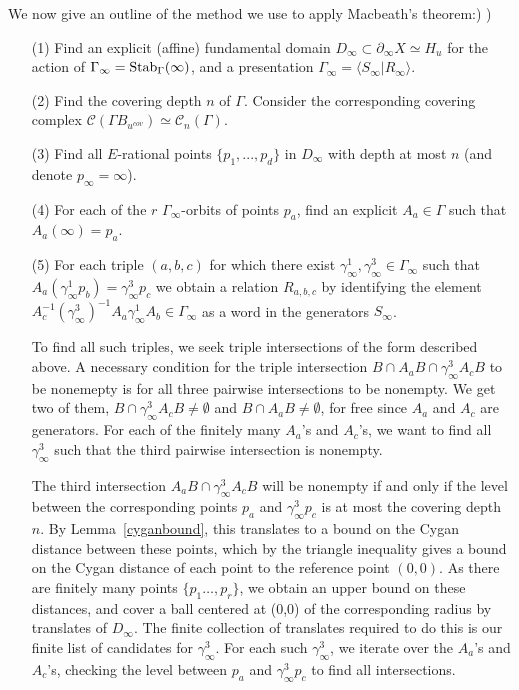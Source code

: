 \documentclass{article}[12pt]
\begin{document}
We now give an outline of the method we use to apply Macbeath's theorem:)
)
\begin{itemize}
\item[(1)] Find an explicit (affine) fundamental domain $D_\infty \subset \partial_\infty X \simeq H_u$ for the action of $\Gamma_\infty={\rm Stab}_\Gamma(\infty)$, and a presentation $\Gamma_\infty= \langle S_\infty \vert R_\infty \rangle$.
\item[(2)] Find the covering depth $n$ of $\Gamma$. 
  Consider the corresponding covering complex $\mathcal{C}(\Gamma B_{u^{cov}}) \simeq \mathcal{C}_n(\Gamma)$.
\item[(3)] Find all $E$-rational points $\{p_1,...,p_d\}$ in $D_\infty$ with depth at most $n$ (and denote $p_\infty=\infty$).
\item[(4)] For each of the $r$ $\Gamma_\infty$-orbits of points $p_a$, find an explicit $A_a \in \Gamma$ such that $A_a(\infty)=p_a$.
\item[(5)] For each triple $(a,b,c)$ for which there exist $\gamma_\infty^1,\gamma_\infty^3 \in\Gamma_\infty$ such that $A_a (\gamma_\infty^1 p_b) = \gamma_\infty^3 p_c$ 
we obtain a relation $R_{a,b,c}$ by identifying the element $A_c^{-1}(\gamma_\infty^3)^{-1}A_a\gamma_\infty^1A_b \in \Gamma_\infty$ as a word in the generators $S_\infty$. 

To find all such triples, we seek triple intersections of the form described above.  A necessary condition for the triple intersection $B\cap A_a B\cap \gamma_\infty^3 A_c B$ to be nonemepty is for all three pairwise intersections to be nonempty.  We get two of them, $B \cap \gamma_\infty^3 A_c B\neq\emptyset$ and $B \cap A_a B\neq\emptyset$, for free since $A_a$ and $A_c$ are generators.  For each of the finitely many $A_a$'s and $A_c$'s, we want to find all $\gamma_\infty^3$ such that the third pairwise intersection is nonempty.

The third intersection $A_a B\cap \gamma_\infty^3 A_c B$ will be nonempty if and only if the level between the corresponding points $p_a$ and $\gamma_\infty^3 p_c$ is at most the covering depth $n$. By Lemma~\ref{cyganbound}, this translates to a bound on the Cygan distance between these points, which by the triangle inequality gives a bound on the Cygan distance of each point to the reference point $(0,0)$. As there are finitely many points $\{p_1\ldots, p_r\}$, we obtain an upper bound on these distances, 
and cover a ball centered at (0,0) of the corresponding radius by translates of $D_\infty$.  The finite collection of translates required to do this is our finite list of candidates for $\gamma_\infty^3$.  For each such $\gamma_\infty^3$, we iterate over the $A_a$'s and $A_c$'s, checking the level between $p_a$ and $\gamma_\infty^3 p_c$ to find all intersections.


\end{itemize}
\end{document}
